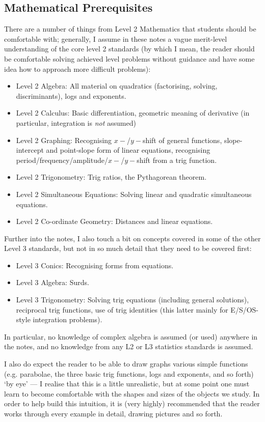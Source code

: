 \subsection*{Mathematical Prerequisites}
There are a number of things from Level 2 Mathematics that students should be
comfortable with; generally, I assume in these notes a vague merit-level understanding
of the core level 2 standards (by which I mean, the reader should be comfortable solving
achieved level problems without guidance and have some idea how to approach more difficult
problems):
\begin{itemize}
  \item Level 2 Algebra: All material on quadratics (factorising, solving, discriminants), logs and exponents.
  \item Level 2 Calculus: Basic differentiation, geometric meaning of derivative (in particular, integration is \textit{not} assumed)
  \item Level 2 Graphing: Recognising $ x-$/$ y-$shift of general functions, slope-intercept and point-slope form of linear equations,
                          recognising period/frequency/amplitude/$ x-$/$ y-$shift from a trig function.
  \item Level 2 Trigonometry: Trig ratios, the Pythagorean theorem.
  \item Level 2 Simultaneous Equations: Solving linear and quadratic simultaneous equations.
  \item Level 2 Co-ordinate Geometry: Distances and linear equations.
\end{itemize}

Further into the notes, I also touch a bit on concepts covered in some of the other Level 3 standards,
but not in so much detail that they need to be covered first:
\begin{itemize}
  \item Level 3 Conics: Recognising forms from equations.
  \item Level 3 Algebra: Surds.
  \item Level 3 Trigonometry: Solving trig equations (including general solutions), reciprocal trig functions, use
                              of trig identities (this latter mainly for E/S/OS-style integration problems).
\end{itemize}
In particular, no knowledge of complex algebra is assumed (or used) anywhere in the notes, and no knowledge from any L2 or L3 statistics standards is assumed.

I also do expect the reader to be able to draw graphs various simple functions (e.g. parabolae, the three basic trig functions, logs and
exponents, and so forth) `by eye' --- I realise that this is a little unrealistic, but at some point one must learn to become comfortable
with the shapes and sizes of the objects we study. In order to help build this intuition, it is (very highly) recommended that the reader
works through every example in detail, drawing pictures and so forth.

